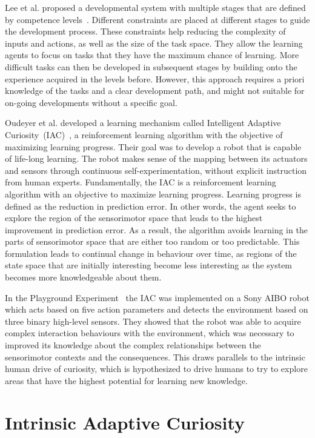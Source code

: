 Lee et al. proposed a developmental system with multiple stages that are defined by competence levels~\cite{Lee2007}. Different constraints are placed at different stages to guide the development process. These constraints help reducing the complexity of inputs and actions, as well as the size of the task space. They allow the learning agents to focus on tasks that they have the maximum chance of learning. More difficult tasks can then be developed in subsequent stages by building onto the experience acquired in the levels before. However, this approach requires a priori knowledge of the tasks and a clear development path, and might not suitable for on-going developments without a specific goal.

Oudeyer et al. developed a learning mechanism called Intelligent Adaptive Curiosity~(IAC)~\cite{Oudeyer2007}, a reinforcement learning algorithm with the objective of maximizing learning progress. Their goal was to develop a robot that is capable of life-long learning. The robot makes sense of the mapping between its actuators and sensors through continuous self-experimentation, without explicit instruction from human experts. Fundamentally, the IAC is a reinforcement learning algorithm with an objective to maximize learning progress. Learning progress is defined as the reduction in prediction error. In other words, the agent seeks to explore the region of the sensorimotor space that leads to the highest improvement in prediction error. As a result, the algorithm avoids learning in the parts of sensorimotor space that are either too random or too predictable. This formulation leads to continual change in behaviour over time, as regions of the state space that are initially interesting become less interesting as the system becomes more knowledgeable about them. 

In the Playground Experiment~\cite{Oudeyer2005} the IAC was implemented on a Sony AIBO robot which acts based on five action parameters and detects the environment based on three binary high-level sensors. They showed that the robot was able to acquire complex interaction behaviours with the environment, which was necessary to improved its knowledge about the complex relationships between the sensorimotor contexts and the consequences. This draws parallels to the intrinsic human drive of curiosity, which is hypothesized to drive humans to try to explore areas that have the highest potential for learning new knowledge.
 
\section{Intrinsic Adaptive Curiosity}

